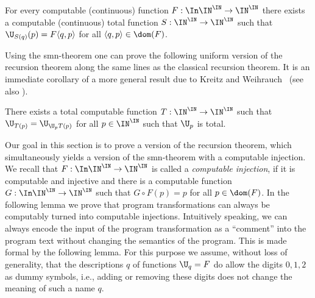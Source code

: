 \documentclass{lmcs}
\begin{document}
\begin{thm}[smn]
\label{thm:smn}
For every computable (continuous) function ${F:\In\IN^\IN\to\IN^\IN}$ 
there exists a computable (continuous) total function
$S:\IN^\IN\to\IN^\IN$ such that $\U_{S(q)}(p)=F\langle q,p\rangle$ for all $\langle q,p\rangle\in\dom(F)$.
\end{thm}

\noindent
Using the smn-theorem one can prove the following uniform version of the recursion theorem along the same lines as the classical recursion theorem.
It is an immediate corollary of a more general result due to Kreitz and Weihrauch~\cite[Theorem~3.4]{KW85}  (see also \cite[Theorem~3.3.20]{Wei87}).

\begin{thm}
\label{thm:recursion-theorem}
There exists a total computable function ${T:\IN^\IN\to\IN^\IN}$ such that 
$\U_{T(p)}=\U_{\U_pT(p)}$
for all $p\in\IN^\IN$ such that $\U_p$ is total.
\end{thm}

\noindent
Our goal in this section is to prove a version of the recursion theorem, which simultaneously yields a
version of the smn-theorem with a computable injection. 
We recall that $F:\In\IN^\IN\to\IN^\IN$ is called a {\em computable injection}, if it is computable
and injective and there is a computable function $G:\In\IN^\IN\to\IN^\IN$ such that
$G\circ F(p)=p$ for all $p\in\dom(F)$.
In the following lemma we prove that program transformations can always be computably turned
into computable injections. 
Intuitively speaking, we can always encode the input of the program transformation
as a ``comment'' into the program text without changing the semantics of the program.
This is made formal by the following lemma.
For this purpose we assume, without loss of generality, that the descriptions $q$ of functions $\U_q=F$ do 
allow the digits $0,1,2$ as dummy symbols, i.e., adding or removing these digits does not change 
the meaning of such a name $q$.
\end{document}
